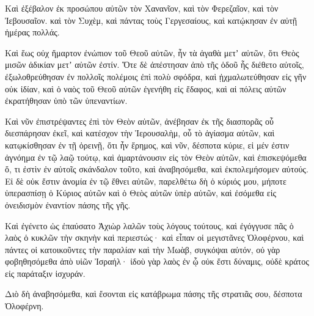 {Καὶ ἐξέβαλον ἐκ προσώπου αὐτῶν τὸν Χανανῖον, καὶ τὸν Φερεζαῖον, καὶ τὸν Ἰεβουσαῖον. καὶ τὸν Συχὲμ, καὶ πάντας τοὺς Γεργεσαίους, καὶ κατῴκησαν ἐν αὐτῇ ἡμέρας πολλάς.
\par }{\PP {}Καὶ ἕως οὐχ ἥμαρτον ἐνώπιον τοῦ Θεοῦ αὐτῶν, ἦν τὰ ἀγαθὰ μετʼ αὐτῶν, ὅτι Θεὸς μισῶν ἀδικίαν μετʼ αὐτῶν ἐστίν.
Ὅτε δὲ ἀπέστησαν ἀπὸ τῆς ὁδοῦ ἧς διέθετο αὐτοῖς, ἐξωλοθρεύθησαν ἐν πολλοῖς πολέμοις ἐπὶ πολὺ σφόδρα, καὶ ᾐχμαλωτεύθησαν εἰς γῆν οὐκ ἰδίαν, καὶ ὁ ναὸς τοῦ Θεοῦ αὐτῶν ἐγενήθη εἰς ἔδαφος, καὶ αἱ πόλεις αὐτῶν ἐκρατήθησαν ὑπὸ τῶν ὑπεναντίων.
\par }{\PP {}Καὶ νῦν ἐπιστρέψαντες ἐπὶ τὸν Θεὸν αὐτῶν, ἀνέβησαν ἐκ τῆς διασπορᾶς οὗ διεσπάρησαν ἐκεῖ, καὶ κατέσχον τὴν Ἱερουσαλὴμ, οὗ τὸ ἁγίασμα αὐτῶν, καὶ κατῳκίσθησαν ἐν τῇ ὀρεινῇ, ὅτι ἦν ἔρημος,
καὶ νῦν, δέσποτα κύριε, εἰ μέν ἐστιν ἀγνόημα ἐν τῷ λαῷ τούτῳ, καὶ ἁμαρτάνουσιν εἰς τὸν Θεὸν αὐτῶν, καὶ ἐπισκεψόμεθα ὅ, τι ἐστὶν ἐν αὐτοῖς σκάνδαλον τοῦτο, καὶ ἀναβησόμεθα, καὶ ἐκπολεμήσομεν αὐτούς.
Εἰ δὲ οὐκ ἔστιν ἀνομία ἐν τῷ ἔθνει αὐτῶν, παρελθέτω δὴ ὁ κύριός μου, μήποτε ὑπερασπίσῃ ὁ Κύριος αὐτῶν καὶ ὁ Θεὸς αὐτῶν ὑπὲρ αὐτῶν, καὶ ἐσόμεθα εἰς ὀνειδισμὸν ἐναντίον πάσης τῆς γῆς.
\par }{\PP {}Καὶ ἐγένετο ὡς ἐπαύσατο Ἀχιὼρ λαλῶν τοὺς λόγους τούτους, καὶ ἐγόγγυσε πᾶς ὁ λαὸς ὁ κυκλῶν τὴν σκηνὴν καὶ περιεστώς· καὶ εἶπαν οἱ μεγιστᾶνες Ὀλοφέρνου, καὶ πάντες οἱ κατοικοῦντες τὴν παραλίαν καὶ τὴν Μωὰβ, συγκόψαι αὐτόν,
οὐ γὰρ φοβηθησόμεθα ἀπὸ υἱῶν Ἰσραήλ· ἰδοὺ γὰρ λαὸς ἐν ᾧ οὐκ ἔστι δύναμις, οὐδὲ κράτος εἰς παράταξιν ἰσχυράν.
\par }{\PP {}Διὸ δὴ ἀναβησόμεθα, καὶ ἔσονται εἰς κατάβρωμα πάσης τῆς στρατιᾶς σου, δέσποτα Ὀλοφέρνη.

}
